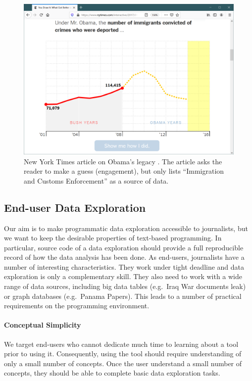 \documentclass[manuscript,review,anonymous]{acmart}
\begin{document}
\begin{figure}
\includegraphics[width=1\columnwidth]{figures/nyt}
\caption{New York Times article on Obama's legacy \cite{youdraw}. The article asks the reader to make a guess
(engagement), but only lists ``Immigration and Customs Enforcement'' as a source of data.}
\label{fig:nyt}
\end{figure}

\subsection{End-user Data Exploration}
Our aim is to make programmatic data exploration accessible to journalists, but we want to keep
the desirable properties of text-based programming. In particular, source code of a data
exploration should provide a full reproducible record of how the data analysis has been done.
As end-users, journalists have a number of interesting characteristics. They work under tight
deadline and data exploration is only a complementary skill. They also need to work with a wide
range of data sources, including big data tables (e.g.~Iraq War documents leak) or graph
databases (e.g.~Panama Papers). This leads to a number of practical requirements on the programming
environment.

\paragraph{Conceptual Simplicity}
We target end-users who cannot dedicate much time to learning about a tool prior
to using it. Consequently, using the tool should require understanding of only a small number
of concepts. Once the user understand a small number of concepts, they should be able to complete
basic data exploration tasks.
\end{document}

